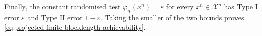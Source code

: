 \documentclass[journal,12pt,draftclsnofoot,onecolumn]{IEEEtran}
\begin{document}
\begin{IEEEproof}
Finally, the constant randomised test
$\varphi_n(x^n)=\varepsilon$ for every $x^n\in\mathcal X^n$ has Type I
error $\varepsilon$ and Type II error $1-\varepsilon$. Taking the
smaller of the two bounds proves
\eqref{eq:projected-finite-blocklength-achievability}.

\end{IEEEproof}



\end{document}
